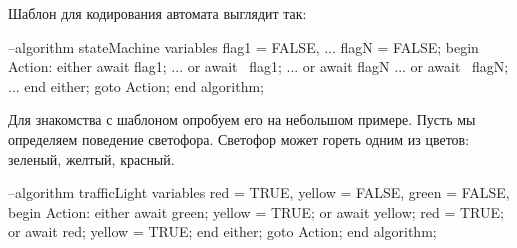 \documentclass[14pt, openany]{book}
\begin{document}
Шаблон для кодирования автомата выглядит так:

\begin{ppcal}
  --algorithm stateMachine
  variables
    flag1 = FALSE,
    ...
    flagN = FALSE;
  begin
    Action:
      either
        await flag1;
        ...
      or 
        await ~flag1;
        ...
      or 
        await flagN
        ...
      or
        await ~flagN;
        ...
      end either;
    goto Action;
  end algorithm;
\end{ppcal}
\begin{tlatex}
%
%
%
%
%
%
%
%
%
%
%
%
%
%
%
%
%
%
%
%
%
%
\end{tlatex}

Для знакомства с шаблоном опробуем его на небольшом примере. Пусть мы определяем поведение светофора. Светофор может гореть одним из цветов: зеленый, желтый, красный. 

\begin{ppcal}
  --algorithm trafficLight
  variables
    red = TRUE,
    yellow = FALSE,
    green = FALSE,
  begin
    Action:
      either
        await green;
        yellow = TRUE;
      or 
        await yellow;
        red = TRUE;
      or 
        await red;
        yellow = TRUE;
      end either;
    goto Action;
  end algorithm;
\end{ppcal}
\begin{tlatex}
%
%
%
%
%
%
%
%
%
%
%
%
%
%
%
%
%
%
%
\end{tlatex}
\end{document}
